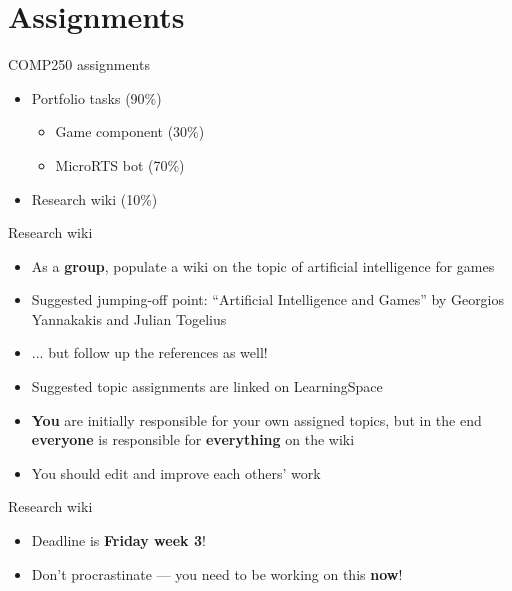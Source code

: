 \part{Assignments}
\frame{\partpage}

\begin{frame}{COMP250 assignments}
	\begin{itemize}
		\pause\item Portfolio tasks (90\%)
			\begin{itemize}
				\pause\item Game component (30\%)
				\pause\item MicroRTS bot (70\%)
			\end{itemize}
		\pause\item Research wiki (10\%)
	\end{itemize}
\end{frame}

\begin{frame}{Research wiki}
    \begin{itemize}
        \pause\item As a \textbf{group}, populate a wiki on the topic of artificial intelligence for games
		\pause\item Suggested jumping-off point: ``Artificial Intelligence and Games'' by Georgios Yannakakis and Julian Togelius
		\pause\item ... but follow up the references as well!
		\pause\item Suggested topic assignments are linked on LearningSpace
		\pause\item \textbf{You} are initially responsible for your own assigned topics,
			but in the end \textbf{everyone} is responsible for \textbf{everything} on the wiki
		\pause\item You should edit and improve each others' work
	\end{itemize}
\end{frame}

\begin{frame}{Research wiki}
    \begin{itemize}
        \pause\item Deadline is \textbf{Friday week 3}!
        \pause\item Don't procrastinate --- you need to be working on this \textbf{now}!
	\end{itemize}
\end{frame}
